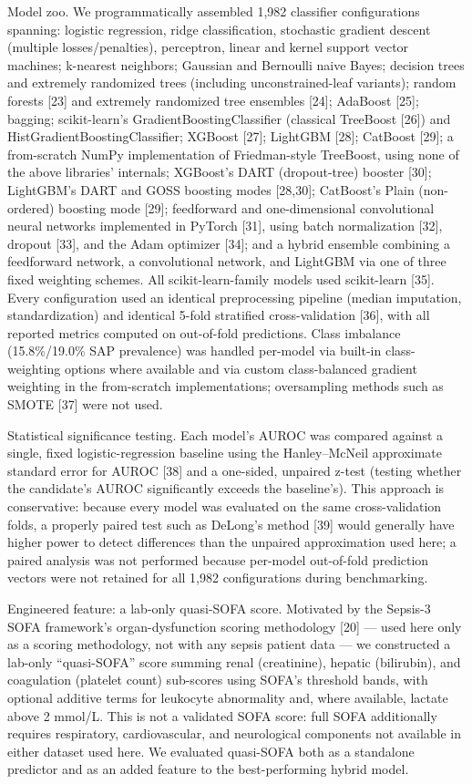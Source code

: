 \documentclass[twoside,11pt]{article}
\begin{document}
Model zoo. We programmatically assembled 1,982 classifier configurations spanning: logistic regression, ridge classification, stochastic gradient descent (multiple losses/penalties), perceptron, linear and kernel support vector machines; k-nearest neighbors; Gaussian and Bernoulli naive Bayes; decision trees and extremely randomized trees (including unconstrained-leaf variants); random forests [23] and extremely randomized tree ensembles [24]; AdaBoost [25]; bagging; scikit-learn's GradientBoostingClassifier (classical TreeBoost [26]) and HistGradientBoostingClassifier; XGBoost [27]; LightGBM [28]; CatBoost [29]; a from-scratch NumPy implementation of Friedman-style TreeBoost, using none of the above libraries' internals; XGBoost's DART (dropout-tree) booster [30]; LightGBM's DART and GOSS boosting modes [28,30]; CatBoost's Plain (non-ordered) boosting mode [29]; feedforward and one-dimensional convolutional neural networks implemented in PyTorch [31], using batch normalization [32], dropout [33], and the Adam optimizer [34]; and a hybrid ensemble combining a feedforward network, a convolutional network, and LightGBM via one of three fixed weighting schemes. All scikit-learn-family models used scikit-learn [35]. Every configuration used an identical preprocessing pipeline (median imputation, standardization) and identical 5-fold stratified cross-validation [36], with all reported metrics computed on out-of-fold predictions. Class imbalance (15.8\%/19.0\% SAP prevalence) was handled per-model via built-in class-weighting options where available and via custom class-balanced gradient weighting in the from-scratch implementations; oversampling methods such as SMOTE [37] were not used.

Statistical significance testing. Each model's AUROC was compared against a single, fixed logistic-regression baseline using the Hanley--McNeil approximate standard error for AUROC [38] and a one-sided, unpaired z-test (testing whether the candidate's AUROC significantly exceeds the baseline's). This approach is conservative: because every model was evaluated on the same cross-validation folds, a properly paired test such as DeLong's method [39] would generally have higher power to detect differences than the unpaired approximation used here; a paired analysis was not performed because per-model out-of-fold prediction vectors were not retained for all 1,982 configurations during benchmarking.

Engineered feature: a lab-only quasi-SOFA score. Motivated by the Sepsis-3 SOFA framework's organ-dysfunction scoring methodology [20] --- used here only as a scoring methodology, not with any sepsis patient data --- we constructed a lab-only ``quasi-SOFA'' score summing renal (creatinine), hepatic (bilirubin), and coagulation (platelet count) sub-scores using SOFA's threshold bands, with optional additive terms for leukocyte abnormality and, where available, lactate above 2 mmol/L. This is not a validated SOFA score: full SOFA additionally requires respiratory, cardiovascular, and neurological components not available in either dataset used here. We evaluated quasi-SOFA both as a standalone predictor and as an added feature to the best-performing hybrid model.
\end{document}
